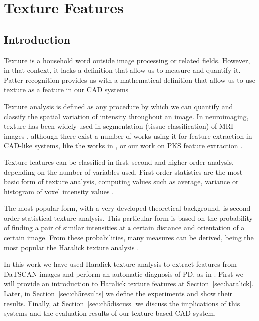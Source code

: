\chapter{Texture Features}\label{ch:texture}
\section{Introduction}
Texture is a household word outside image processing or related fields. However, in that context, it lacks a definition that allow us to measure and quantify it. Patter recognition provides us with a mathematical definition that allow us to use texture as a feature in our \ac{CAD} systems. 

Texture analysis is defined as any procedure by which we can quantify and classify the spatial variation of intensity throughout an image. In neuroimaging, texture has been widely used in segmentation (tissue classification) of \ac{MRI} images \cite{Saeed2002,Alejo2003,Wang2009}, although there exist a number of works using it for feature extraction in \ac{CAD}-like systems, like the works in \cite{kovalev2001three,sikio2015mr}, or our work on \ac{PKS} feature extraction \cite{Martinez-Murcia2013266,martinez2014parametrization}. 

Texture features can be classified in first, second and higher order analysis, depending on the number of variables used. First order statistics \cite{Martinez-Murcia2016b} are the most basic form of texture analysis, computing values such as average, variance or histogram of voxel intensity values \cite{Srinivasan2008}. 

The most popular form, with a very developed theoretical background, is second-order statistical texture analysis. This particular form is based on the probability of finding a pair of similar intensities at a certain distance and orientation of a certain image. From these probabilities, many measures can be derived, being the most popular the Haralick texture analysis \cite{Haralick73}. 

In this work we have used Haralick texture analysis to extract features from DaTSCAN images and perform an automatic diagnosis of \ac{PD}, as in \cite{Martinez-Murcia2013266,martinez2014parametrization}. First we will provide an introduction to Haralick texture features at Section~\ref{sec:haralick}. Later, in Section~\ref{sec:ch5results} we define the experiments and show their results. Finally, at Section~\ref{sec:ch5discuss} we discuss the implications of this systems and the evaluation results of our texture-based \ac{CAD} system.

